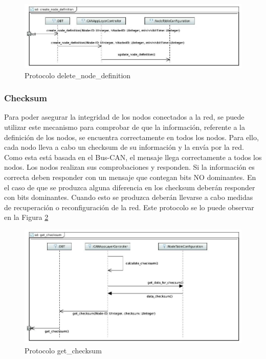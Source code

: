 \begin{figure}[h!]
 \centering
 \includegraphics[scale=0.4]{images/Secciones/AppendixA/create_node_definition.JPG}
  \caption{Protocolo delete\_node\_definition}
\label{fig:delete_node_definition}
\end{figure}


\subsubsection{Checksum}
Para poder asegurar la integridad de los nodos conectados a la red, se puede
utilizar este mecanismo para comprobar de que la información, referente a
la definición de los nodos, se encuentra correctamente en todos los nodos. Para
ello, cada nodo lleva a cabo un checksum de su información y la envía por la
red. Como esta está basada en el Bus-CAN, el mensaje llega correctamente a todos
los nodos. Los nodos realizan sus comprobaciones y responden. Si la información
es correcta deben responder con un mensaje que contegan bits NO dominantes. En
el caso de que se produzca alguna diferencia en los checksum deberán responder
con bits dominantes. Cuando esto se produzca deberán llevarse a cabo medidas de
recuperación o reconfiguración de la red. Este protocolo se lo puede observar en
la Figura \ref{fig:get_checksum}

\begin{figure}[h!]
 \centering
 \includegraphics[scale=0.4]{images/Secciones/AppendixA/get_checksum.JPG}
  \caption{Protocolo get\_checksum}
\label{fig:get_checksum}
\end{figure}

